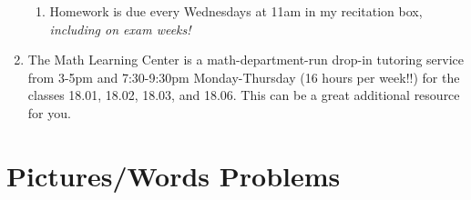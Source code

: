 \documentclass[11pt]{article}
\begin{document}
\begin{enumerate}
\begin{enumerate}
  
 \item Homework is due every Wednesdays at 11am in my recitation box, \textit{including on exam weeks!}
 
  \end{enumerate}
 
 \item The Math Learning Center is a math-department-run drop-in tutoring service from 3-5pm and 7:30-9:30pm Monday-Thursday (16 hours per week!!) for the classes 18.01, 18.02, 18.03, and 18.06.  This can be a great additional resource for you.
 
 \end{enumerate}

\section{Pictures/Words Problems}
\end{document}
